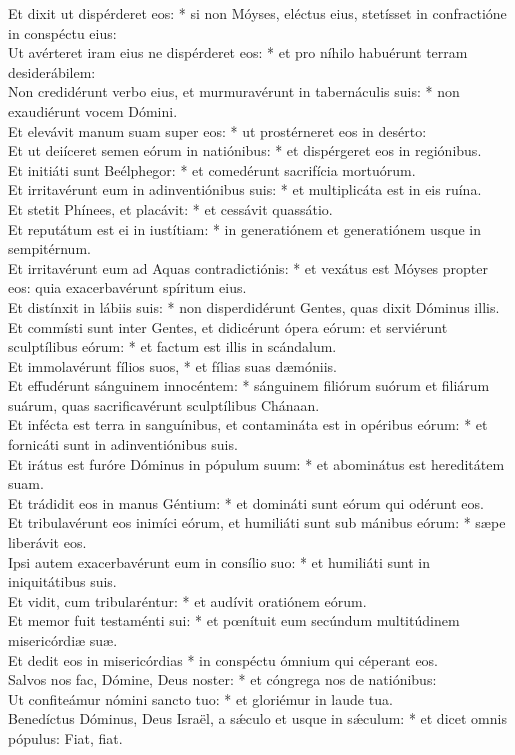 {	Et dixit ut dispérderet eos: * si non Móyses, eléctus eius, stetísset in confractióne in conspéctu eius: \\
	Ut avérteret iram eius ne dispérderet eos: * et pro níhilo habuérunt terram desiderábilem: \\
	Non credidérunt verbo eius, et murmuravérunt in tabernáculis suis: * non exaudiérunt vocem Dómini. \\
	Et elevávit manum suam super eos: * ut prostérneret eos in desérto: \\
	Et ut deiíceret semen eórum in natiónibus: * et dispérgeret eos in regiónibus. \\
	Et initiáti sunt Beélphegor: * et comedérunt sacrifícia mortuórum. \\
	Et irritavérunt eum in adinventiónibus suis: * et multiplicáta est in eis ruína. \\
	Et stetit Phínees, et placávit: * et cessávit quassátio. \\
	Et reputátum est ei in iustítiam: * in generatiónem et generatiónem usque in sempitérnum. \\
	Et irritavérunt eum ad Aquas contradictiónis: * et vexátus est Móyses propter eos: quia exacerbavérunt spíritum eius. \\
	Et distínxit in lábiis suis: * non disperdidérunt Gentes, quas dixit Dóminus illis. \\
	Et commísti sunt inter Gentes, et didicérunt ópera eórum: et serviérunt sculptílibus eórum: * et factum est illis in scándalum. \\
	Et immolavérunt fílios suos, * et fílias suas dæmóniis. \\
	Et effudérunt sánguinem innocéntem: * sánguinem filiórum suórum et filiárum suárum, quas sacrificavérunt sculptílibus Chánaan. \\
	Et infécta est terra in sanguínibus, et contamináta est in opéribus eórum: * et fornicáti sunt in adinventiónibus suis. \\
	Et irátus est furóre Dóminus in pópulum suum: * et abominátus est hereditátem suam. \\
	Et trádidit eos in manus Géntium: * et domináti sunt eórum qui odérunt eos. \\
	Et tribulavérunt eos inimíci eórum, et humiliáti sunt sub mánibus eórum: * sæpe liberávit eos. \\
	Ipsi autem exacerbavérunt eum in consílio suo: * et humiliáti sunt in iniquitátibus suis. \\
	Et vidit, cum tribularéntur: * et audívit oratiónem eórum. \\
	Et memor fuit testaménti sui: * et pœnítuit eum secúndum multitúdinem misericórdiæ suæ. \\
	Et dedit eos in misericórdias * in conspéctu ómnium qui céperant eos. \\
	Salvos nos fac, Dómine, Deus noster: * et cóngrega nos de natiónibus: \\
	Ut confiteámur nómini sancto tuo: * et gloriémur in laude tua. \\
	Benedíctus Dóminus, Deus Israël, a sǽculo et usque in sǽculum: * et dicet omnis pópulus: Fiat, fiat.
}

